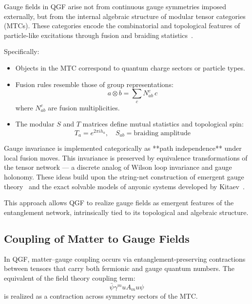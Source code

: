 \documentclass[11pt]{article}
\def\mu{mu}
\begin{document}
Gauge fields in QGF arise not from continuous gauge symmetries imposed externally, but from the internal algebraic structure of modular tensor categories (MTCs). These categories encode the combinatorial and topological features of particle-like excitations through fusion and braiding statistics~\cite{levin2005string,kitaev2006anyons,kong2014anyon}.

Specifically:
\begin{itemize}
    \item Objects in the MTC correspond to quantum charge sectors or particle types.
    \item Fusion rules resemble those of group representations:
    \begin{equation}
    a \otimes b = \sum_c N_{ab}^c \, c
    \end{equation}
    where \( N_{ab}^c \) are fusion multiplicities.
    \item The modular \( S \) and \( T \) matrices define mutual statistics and topological spin:
    \begin{equation}
    T_a = e^{2\pi i h_a}, \quad S_{ab} = \text{braiding amplitude}
    \end{equation}
\end{itemize}

Gauge invariance is implemented categorically as **path independence** under local fusion moves. This invariance is preserved by equivalence transformations of the tensor network — a discrete analog of Wilson loop invariance and gauge holonomy. These ideas build upon the string-net construction of emergent gauge theory~\cite{levin2005string} and the exact solvable models of anyonic systems developed by Kitaev~\cite{kitaev2006anyons}.

This approach allows QGF to realize gauge fields as emergent features of the entanglement network, intrinsically tied to its topological and algebraic structure.


\subsection{Coupling of Matter to Gauge Fields}

In QGF, matter--gauge coupling occurs via entanglement-preserving contractions between tensors that carry both fermionic and gauge quantum numbers. The equivalent of the field theory coupling term:
\begin{equation}
\bar{\psi} \gamma^\mu A_\mu \psi
\end{equation}
is realized as a contraction across symmetry sectors of the MTC.
\end{document}
